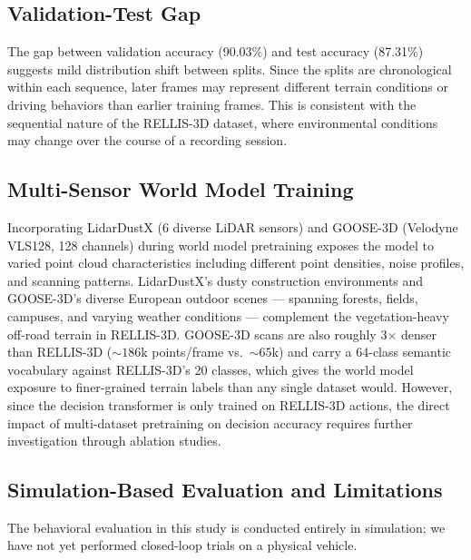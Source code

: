 \documentclass[sensors,article,submit,pdftex,moreauthors]{Definitions/mdpi}
\begin{document}
\subsection{Validation-Test Gap}

The gap between validation accuracy (90.03\%) and test accuracy (87.31\%) suggests mild distribution shift between splits. Since the splits are chronological within each sequence, later frames may represent different terrain conditions or driving behaviors than earlier training frames. This is consistent with the sequential nature of the RELLIS-3D dataset, where environmental conditions may change over the course of a recording session.

\subsection{Multi-Sensor World Model Training}

Incorporating LidarDustX (6 diverse LiDAR sensors) and GOOSE-3D (Velodyne VLS128, 128 channels) during world model pretraining exposes the model to varied point cloud characteristics including different point densities, noise profiles, and scanning patterns. LidarDustX's dusty construction environments and GOOSE-3D's diverse European outdoor scenes --- spanning forests, fields, campuses, and varying weather conditions --- complement the vegetation-heavy off-road terrain in RELLIS-3D. GOOSE-3D scans are also roughly 3$\times$ denser than RELLIS-3D (${\sim}186$k points/frame vs.\ ${\sim}65$k) and carry a 64-class semantic vocabulary against RELLIS-3D's 20 classes, which gives the world model exposure to finer-grained terrain labels than any single dataset would. However, since the decision transformer is only trained on RELLIS-3D actions, the direct impact of multi-dataset pretraining on decision accuracy requires further investigation through ablation studies.

\subsection{Simulation-Based Evaluation and Limitations}
\label{sec:limitations}

The behavioral evaluation in this study is conducted entirely in simulation; we have not yet performed closed-loop trials on a physical vehicle.
\end{document}

